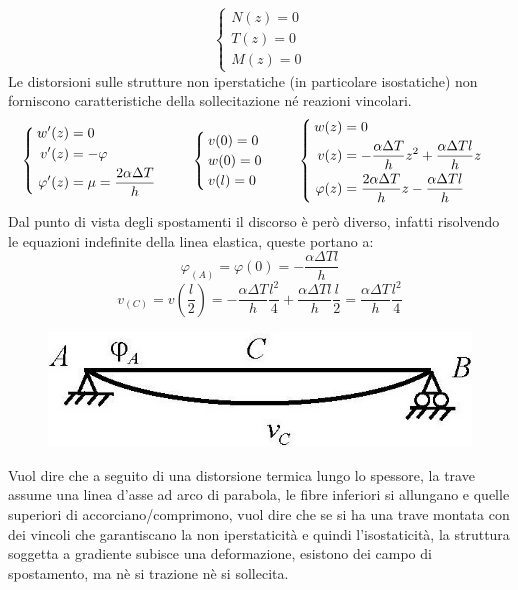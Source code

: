 \documentclass{article}
\begin{document}
\begin{adjustwidth}{2in}{}
		\[
		\begin{cases}
			N(z) = 0 \\
			T(z) = 0 \\
			M(z) = 0
		\end{cases} \]
		Le distorsioni sulle strutture non iperstatiche (in
		particolare isostatiche) non forniscono
		caratteristiche della sollecitazione né reazioni
		vincolari.
		\[
		\begin{cases}
			\begin{aligned}
				w'(z) & = 0 \\
				v'(z) & = -\varphi \\
				\varphi'(z) & =\mu = \dfrac{2\alpha\Delta T}{h}
			\end{aligned}
		\end{cases} \hspace{0.5cm}
		\begin{cases}
			v(0) = 0 \\
			w(0) = 0 \\
			v(l) = 0
		\end{cases} \hspace{0.5cm}
		\begin{cases}
			\begin{aligned}
				w(z) & = 0 \\
				v(z) & = -\dfrac{\alpha\Delta T}{h}z^2 + \dfrac{\alpha\Delta Tl}{h} z \\
				\varphi(z) & = \dfrac{2\alpha\Delta T}{h}z - \dfrac{\alpha\Delta Tl}{h} \\			
			\end{aligned}
		\end{cases}
		\]
		Dal punto di vista degli spostamenti il discorso è però diverso, infatti risolvendo le equazioni indefinite della linea elastica, queste portano a:
		\[ \varphi_(A) = \varphi(0) = - \dfrac{\alpha\Delta Tl}{h} \]
		\[ v_(C) = v(\dfrac{l}{2}) = -\dfrac{\alpha\Delta T}{h}\dfrac{l^2}{4} + \dfrac{\alpha\Delta Tl}{h} \dfrac{l}{2} = \dfrac{\alpha\Delta T}{h} \dfrac{l^2}{4} \]
		
\begin{figure}[H]
	\centering
	\includegraphics[width=0.2\linewidth]{"immagini/1.PARTE8_Pagina_18"}
\end{figure}

		Vuol dire che a seguito di una distorsione termica lungo lo spessore, la trave assume una linea d'asse ad arco di parabola, le fibre inferiori si allungano e quelle superiori di accorciano/comprimono, vuol dire che se si ha una trave montata con dei vincoli che garantiscano la non iperstaticità e quindi l'isostaticità, la struttura soggetta a gradiente subisce una deformazione, esistono dei campo di spostamento, ma nè si trazione nè si sollecita. \newline 
		

\end{adjustwidth}
\end{document}
